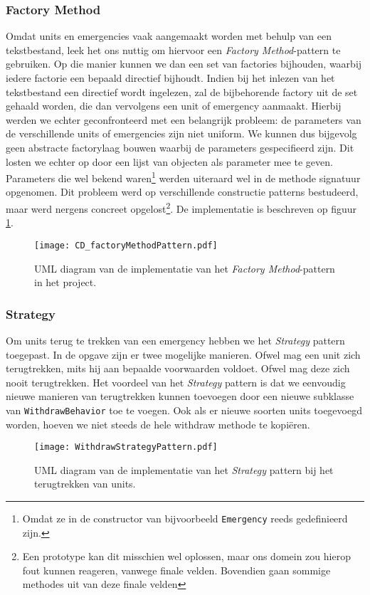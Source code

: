 \subsubsection{Factory Method}
Omdat units en emergencies vaak aangemaakt worden met behulp van een tekstbestand, leek het ons nuttig om hiervoor een \textit{Factory Method}-pattern te gebruiken. Op die manier kunnen we dan een set van factories bijhouden, waarbij iedere factorie een bepaald directief bijhoudt. Indien bij het inlezen van het tekstbestand een directief wordt ingelezen, zal de bijbehorende factory uit de set gehaald worden, die dan vervolgens een unit of emergency aanmaakt. Hierbij werden we echter geconfronteerd met een belangrijk probleem: de parameters van de verschillende units of emergencies zijn niet uniform. We kunnen dus bijgevolg geen abstracte factorylaag bouwen waarbij de parameters gespecifieerd zijn. Dit losten we echter op door een lijst van objecten als parameter mee te geven. Parameters die wel bekend waren\footnote{Omdat ze in de constructor van bijvoorbeeld \texttt{Emergency} reeds gedefinieerd zijn.} werden uiteraard wel in de methode signatuur opgenomen. Dit probleem werd op verschillende constructie patterns bestudeerd, maar werd nergens concreet opgelost\footnote{Een prototype kan dit misschien wel oplossen, maar ons domein zou hierop fout kunnen reageren, vanwege finale velden. Bovendien gaan sommige methodes uit van deze finale velden}. De implementatie is beschreven op figuur \ref{fig:factoryMethodPattern}.
\begin{figure}[h!]
\texttt{[image: CD\_factoryMethodPattern.pdf]}
\caption{UML diagram van de implementatie van het \textit{Factory Method}-pattern in het project.}
\label{fig:factoryMethodPattern}
\end{figure}
\subsubsection{Strategy}
Om units terug te trekken van een emergency hebben we het \textit{Strategy} pattern toegepast. In de opgave zijn er twee mogelijke manieren. Ofwel mag een unit zich terugtrekken, mits hij aan bepaalde voorwaarden voldoet. Ofwel mag deze zich nooit terugtrekken. Het voordeel van het \textit{Strategy} pattern is dat we eenvoudig nieuwe manieren van terugtrekken kunnen toevoegen door een nieuwe subklasse van \texttt{WithdrawBehavior} toe te voegen. Ook als er nieuwe soorten units toegevoegd worden, hoeven we niet steeds de hele withdraw methode te kopi\"eren.
\begin{figure}[h!]
\texttt{[image: WithdrawStrategyPattern.pdf]}
\caption{UML diagram van de implementatie van het \textit{Strategy} pattern bij het terugtrekken van units.}
\label{fig:withdrawStrategyPattern}
\end{figure}
